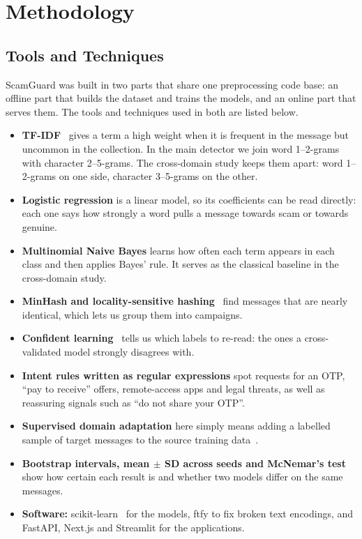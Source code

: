 \chapter{Methodology}

\section{Tools and Techniques}
ScamGuard was built in two parts that share one preprocessing code base: an offline part that builds the dataset and trains the models, and an online part that serves them. The tools and techniques used in both are listed below.
\begin{itemize}
\item \textbf{TF-IDF}~\cite{salton1988term} gives a term a high weight when it is frequent in the message but uncommon in the collection. In the main detector we join word 1--2-grams with character 2--5-grams. The cross-domain study keeps them apart: word 1--2-grams on one side, character 3--5-grams on the other.
\item \textbf{Logistic regression} is a linear model, so its coefficients can be read directly: each one says how strongly a word pulls a message towards scam or towards genuine.
\item \textbf{Multinomial Naive Bayes} learns how often each term appears in each class and then applies Bayes' rule. It serves as the classical baseline in the cross-domain study.
\item \textbf{MinHash and locality-sensitive hashing}~\cite{broder1997resemblance} find messages that are nearly identical, which lets us group them into campaigns.
\item \textbf{Confident learning}~\cite{northcutt2021confident} tells us which labels to re-read: the ones a cross-validated model strongly disagrees with.
\item \textbf{Intent rules written as regular expressions} spot requests for an OTP, ``pay to receive'' offers, remote-access apps and legal threats, as well as reassuring signals such as ``do not share your OTP''.
\item \textbf{Supervised domain adaptation} here simply means adding a labelled sample of target messages to the source training data~\cite{daume2007frustratingly,pan2010survey}.
\item \textbf{Bootstrap intervals, mean $\pm$ SD across seeds and McNemar's test}~\cite{mcnemar1947note,dietterich1998approximate} show how certain each result is and whether two models differ on the same messages.
\item \textbf{Software:} scikit-learn~\cite{pedregosa2011scikit} for the models, ftfy to fix broken text encodings, and FastAPI, Next.js and Streamlit for the applications.
\end{itemize}


